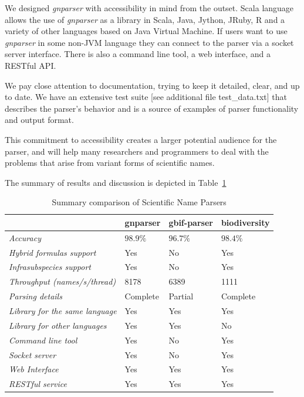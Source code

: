 \documentclass{bmcart}
\begin{document}
We designed \textit{gnparser} with accessibility in mind from the outset. Scala
language allows the use of \textit{gnparser} as a library in Scala, Java,
Jython, JRuby, R and a variety of other languages based on Java Virtual
Machine. If users want to use \textit{gnparser}  in some non-JVM language
they can connect to the parser via a socket server interface. There is also a
command line tool, a web interface, and a RESTful API.

We pay close attention to documentation, trying to keep it detailed, clear, and
up to date. We have an extensive test suite [see additional file
test\_data.txt] that describes the parser's behavior and is a source of
examples of parser functionality and output format.

This commitment to accessibility creates a larger potential audience for the
parser, and will help many researchers and programmers to deal with the
problems that arise from variant forms of scientific names.

The summary of results and discussion is depicted in
Table~\ref{table:summary}

\begin{table}[htb]
  \begin{center}
    \caption{Summary comparison of Scientific Name Parsers}
    \label{table:summary}
    \resizebox{12.5cm}{!} {\begin{tabular}{|l|*{3}{l}|}
      \hline
                             & gnparser & gbif-parser & biodiversity \\
      \hline
      \textit{Accuracy}                     & $98.9\%$ & $96.7\%$ & $98.4\%$\\
      \textit{Hybrid formulas support}      & Yes      & No       & Yes     \\
      \textit{Infrasubspecies support}      & Yes      & No       & Yes     \\
      \textit{Throughput (names/s/thread)}  & 8178     & 6389     & 1111    \\
      \textit{Parsing details}              & Complete & Partial  & Complete\\
      \textit{Library for the same language}& Yes      & Yes      & Yes     \\
      \textit{Library for other languages}  & Yes      & Yes      & No      \\
      \textit{Command line tool}            & Yes      & No       & Yes     \\
      \textit{Socket server}                & Yes      & No       & Yes     \\
      \textit{Web Interface}                & Yes      & Yes      & Yes     \\
      \textit{RESTful service}              & Yes      & Yes      & Yes     \\
      \hline
    \end{tabular}
  }
  \end{center}
\end{table}
\end{document}
